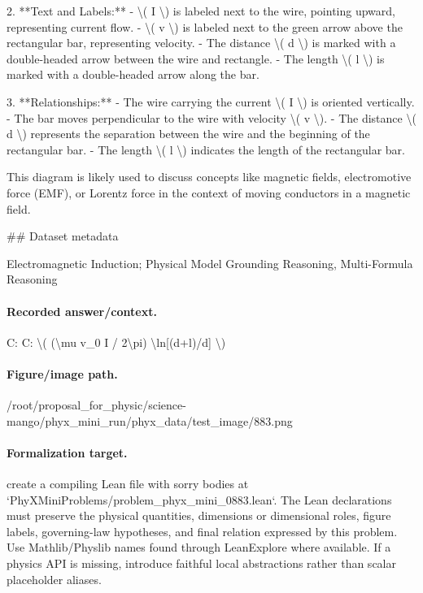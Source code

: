 2. **Text and Labels:**
   - \textbackslash{}( I \textbackslash{}) is labeled next to the wire, pointing upward, representing current flow.
   - \textbackslash{}( v \textbackslash{}) is labeled next to the green arrow above the rectangular bar, representing velocity.
   - The distance \textbackslash{}( d \textbackslash{}) is marked with a double-headed arrow between the wire and rectangle.
   - The length \textbackslash{}( l \textbackslash{}) is marked with a double-headed arrow along the bar.

3. **Relationships:**
   - The wire carrying the current \textbackslash{}( I \textbackslash{}) is oriented vertically.
   - The bar moves perpendicular to the wire with velocity \textbackslash{}( v \textbackslash{}).
   - The distance \textbackslash{}( d \textbackslash{}) represents the separation between the wire and the beginning of the rectangular bar.
   - The length \textbackslash{}( l \textbackslash{}) indicates the length of the rectangular bar.

This diagram is likely used to discuss concepts like magnetic fields, electromotive force (EMF), or Lorentz force in the context of moving conductors in a magnetic field.

\#\# Dataset metadata

Electromagnetic Induction; Physical Model Grounding Reasoning, Multi-Formula Reasoning

\paragraph{Recorded answer/context.}
C: C: \textbackslash{}( (\textbackslash{}mu v\_0 I / 2\textbackslash{}pi) \textbackslash{}ln[(d+l)/d] \textbackslash{})

\paragraph{Figure/image path.}
/root/proposal\_for\_physic/science-mango/phyx\_mini\_run/phyx\_data/test\_image/883.png

\paragraph{Formalization target.}
create a compiling Lean file with sorry bodies at `PhyXMiniProblems/problem\_phyx\_mini\_0883.lean`. The Lean declarations must preserve the physical quantities, dimensions or dimensional roles, figure labels, governing-law hypotheses, and final relation expressed by this problem.
Use Mathlib/Physlib names found through LeanExplore where available. If a physics API is missing, introduce faithful local abstractions rather than scalar placeholder aliases.

